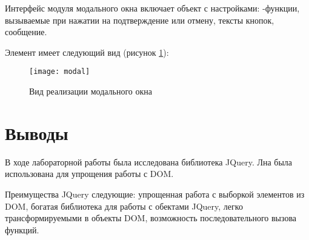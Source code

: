 \documentclass[a4paper,14pt]{extarticle}
\begin{document}
Интерфейс модуля модального окна включает объект с настройками: -функции,
вызываемые при нажатии на подтверждение или отмену, тексты кнопок, сообщение.

Элемент имеет следующий вид (рисунок \ref{fig:modal}):
\begin{figure}[H]
    \centering
    \texttt{[image: modal]}
    \caption{Вид реализации модального окна}
    \label{fig:modal}
\end{figure}

\section*{Выводы}
В ходе лабораторной работы была исследована библиотека JQuery. Лна была использована
для упрощения работы с DOM.

Преимущества JQuery следующие: упрощенная работа с выборкой элементов из DOM,
богатая библиотека для работы с обектами JQuery, легко трансформируемыми в объекты DOM,
возможность последовательного вызова функций.
\end{document}
